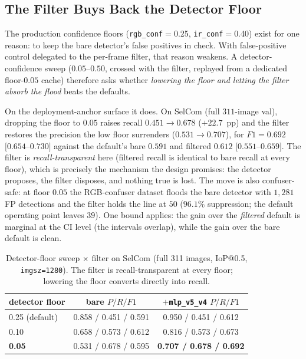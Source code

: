 \subsection{The Filter Buys Back the Detector Floor}
\label{sec:lowconf_mode}

The production confidence floors (\texttt{rgb\_conf}$=$0.25, \texttt{ir\_conf}$=$0.40) exist for one reason: to keep the bare detector's false positives in check. With false-positive control delegated to the per-frame filter, that reason weakens. A detector-confidence sweep ($0.05$--$0.50$, crossed with the filter, replayed from a dedicated floor-$0.05$ cache) therefore asks whether \emph{lowering the floor and letting the filter absorb the flood} beats the defaults.

On the deployment-anchor surface it does. On SelCom (full $311$-image val), dropping the floor to $0.05$ raises recall $0.451 \to 0.678$ ($+22.7$~pp) and the filter restores the precision the low floor surrenders ($0.531 \to 0.707$), for $F1 = 0.692$ $[0.654$--$0.730]$ against the default's bare $0.591$ and filtered $0.612$ $[0.551$--$0.659]$. The filter is \emph{recall-transparent} here (filtered recall is identical to bare recall at every floor), which is precisely the mechanism the design promises: the detector proposes, the filter disposes, and nothing true is lost. The move is also confuser-safe: at floor $0.05$ the RGB-confuser dataset floods the bare detector with $1{,}281$ FP detections and the filter holds the line at $50$ ($96.1\%$ suppression; the default operating point leaves $39$). One bound applies: the gain over the \emph{filtered} default is marginal at the CI level (the intervals overlap), while the gain over the bare default is clean.

\begin{table}[htbp]
    \centering
    \caption{Detector-floor sweep $\times$ filter on SelCom (full 311 images, IoP@0.5, \texttt{imgsz=1280}). The filter is recall-transparent at every floor; lowering the floor converts directly into recall.}
    \label{tab:lowconf_selcom}
    \begin{tabular}{lcc}
        \toprule
        detector floor & bare $P/R/F1$ & $+$\texttt{mlp\_v5\_v4} $P/R/F1$ \\
        \midrule
        0.25 (default) & 0.858 / 0.451 / 0.591 & 0.950 / 0.451 / 0.612 \\
        0.10           & 0.658 / 0.573 / 0.612 & 0.816 / 0.573 / 0.673 \\
        \textbf{0.05}  & 0.531 / 0.678 / 0.595 & \textbf{0.707 / 0.678 / 0.692} \\
        \bottomrule
    \end{tabular}
\end{table}

